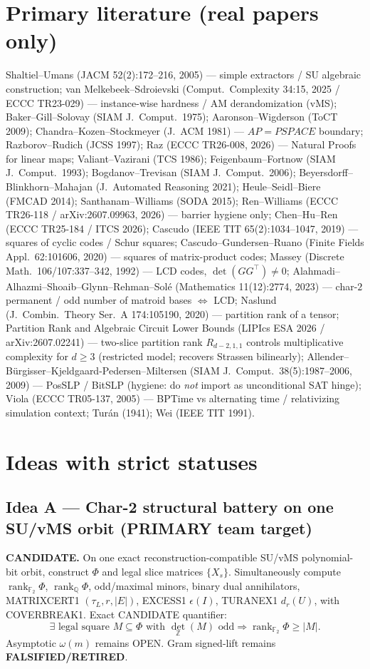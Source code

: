 \documentclass[11pt]{article}
\begin{document}
\section*{Primary literature (real papers only)}
Shaltiel--Umans (JACM 52(2):172--216, 2005) --- simple extractors / SU algebraic construction;
van Melkebeek--Sdroievski (Comput.\ Complexity 34:15, 2025 / ECCC TR23-029) --- instance-wise
hardness / AM derandomization (vMS);
Baker--Gill--Solovay (SIAM J.\ Comput.\ 1975); Aaronson--Wigderson (ToCT 2009);
Chandra--Kozen--Stockmeyer (J.\ ACM 1981) --- $AP=PSPACE$ boundary;
Razborov--Rudich (JCSS 1997); Raz (ECCC TR26-008, 2026) --- Natural Proofs for linear maps;
Valiant--Vazirani (TCS 1986); Feigenbaum--Fortnow (SIAM J.\ Comput.\ 1993);
Bogdanov--Trevisan (SIAM J.\ Comput.\ 2006);
Beyersdorff--Blinkhorn--Mahajan (J.\ Automated Reasoning 2021);
Heule--Seidl--Biere (FMCAD 2014); Santhanam--Williams (SODA 2015);
Ren--Williams (ECCC TR26-118 / arXiv:2607.09963, 2026) --- barrier hygiene only;
Chen--Hu--Ren (ECCC TR25-184 / ITCS 2026); Cascudo (IEEE TIT 65(2):1034--1047, 2019) ---
squares of cyclic codes / Schur squares;
Cascudo--Gundersen--Ruano (Finite Fields Appl.\ 62:101606, 2020) --- squares of matrix-product codes;
Massey (Discrete Math.\ 106/107:337--342, 1992) --- LCD codes, $\det(GG^\top)\neq 0$;
Alahmadi--Alhazmi--Shoaib--Glynn--Rehman--Sol\'e (Mathematics 11(12):2774, 2023) ---
char-$2$ permanent / odd number of matroid bases $\Leftrightarrow$ LCD;
Naslund (J.\ Combin.\ Theory Ser.\ A 174:105190, 2020) --- partition rank of a tensor;
Partition Rank and Algebraic Circuit Lower Bounds (LIPIcs ESA 2026 / arXiv:2607.02241) ---
two-slice partition rank $R_{d-2,1,1}$ controls multiplicative complexity for $d\ge 3$
(restricted model; recovers Strassen bilinearly);
Allender--B\"urgisser--Kjeldgaard-Pedersen--Miltersen (SIAM J.\ Comput.\ 38(5):1987--2006, 2009)
--- PosSLP / BitSLP (hygiene: do \emph{not} import as unconditional SAT hinge);
Viola (ECCC TR05-137, 2005) --- BPTime vs alternating time / relativizing simulation context;
Tur\'an (1941); Wei (IEEE TIT 1991).

\section*{Ideas with strict statuses}
\subsection*{Idea A --- Char-2 structural battery on one SU/vMS orbit (PRIMARY team target)}
\textbf{CANDIDATE.} On one exact reconstruction-compatible SU/vMS polynomial-bit orbit, construct
$\Phi$ and legal slice matrices $\{X_s\}$. Simultaneously compute
$\operatorname{rank}_{\mathbb F_2}\Phi$, $\operatorname{rank}_{\mathbb Q}\Phi$, odd/maximal minors,
binary dual annihilators, MATRIXCERT1 $(\tau_L,r,|E|)$, EXCESS1 $\epsilon(I)$, TURANEX1 $d_r(U)$,
with COVERBREAK1. Exact CANDIDATE quantifier:
\[
\exists\text{ legal square }M\subseteq\Phi\text{ with }\det_{\mathbb Z}(M)\text{ odd}
\Rightarrow\operatorname{rank}_{\mathbb F_2}\Phi\ge|M|.
\]
Asymptotic $\omega(m)$ remains OPEN. Gram signed-lift remains \textbf{FALSIFIED/RETIRED}.
\end{document}
